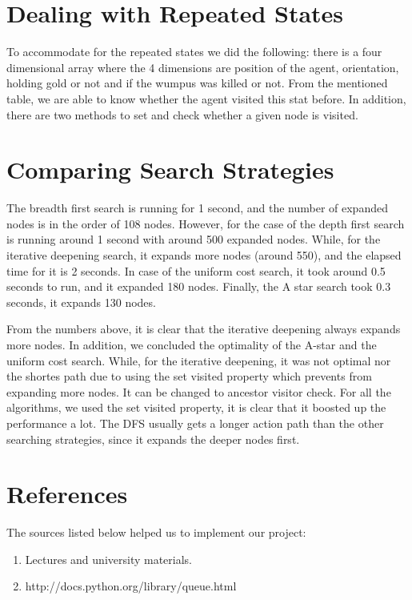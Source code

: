 \section{Dealing with Repeated States}

To accommodate for the repeated states we did the following: there is a four dimensional array where the 4 dimensions are position of the agent, orientation, holding gold or not and if the wumpus was killed or not. From the mentioned table, we are able to know whether the agent visited this stat before. In addition, there are two methods to set and check whether a given node is visited.

\section{Comparing Search Strategies}

The breadth first search is running for 1 second, and the number of expanded nodes is in the order of 108 nodes. However, for the case of the depth first search is running around 1 second with around 500 expanded nodes. While, for the iterative deepening search, it expands more nodes (around 550), and the elapsed time for it is 2 seconds. In case of the uniform cost search, it took around 0.5 seconds to run, and it expanded 180 nodes. Finally, the A star search took 0.3 seconds, it expands 130 nodes.

From the numbers above, it is clear that the iterative deepening always expands more nodes. In addition, we concluded the optimality of the A-star and the uniform cost search. While, for the iterative deepening, it was not optimal nor the shortes path due to using the set visited property which prevents from expanding more nodes. It can be changed to ancestor visitor check. For all the algorithms, we used the set visited property, it is clear that it boosted up the performance a lot. The DFS usually gets a longer action path than the other searching strategies, since it expands the deeper nodes first.

\section{References}

The sources listed below helped us to implement our project:

\begin{enumerate}

\item Lectures and university materials.

\item http://docs.python.org/library/queue.html

\end{enumerate}

		




 
